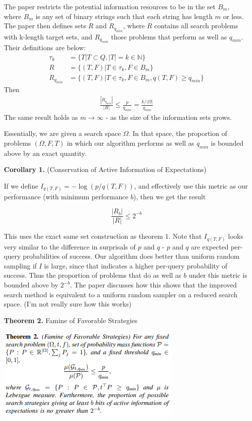 \documentclass[12pt]{article}
\begin{document}
The paper restricts the potential information resources to be in the set $B_m$, where $B_m$ is any set of binary strings such that each string has length $m$ or less. The paper then defines sets $R$ and $R_{q_{min}}$, where $R$ contains all search problems with k-length target sets, and $R_{q_{min}}$ those problems that perform as well as $q_{min}$. Their definitions are below: 
\begin{align*}
    \tau_k &= \{T | T \subset Q, |T| = k \in \mathds{N}\} \\ 
    R &= \{(T,F) | T \in \tau_k, F \in B_m\} \\
    R_{q_{min}} &= \{(T,F) | T \in \tau_k, F \in B_m, q(T,F) \geq q_{min}\}
\end{align*}
Then 
\begin{align*}
    \frac{|R_{q_{min}}|}{|R|} \leq \frac{p}{q_{min}} = \frac{k / |\Omega|}{q_{min}}
\end{align*}
The same result holds as $m \to \infty$ - as the size of the information sets grows.

Essentially, we are given a search space $\Omega$. In that space, the proportion of problems $(\Omega, F, T)$ in which our algorithm performs as well as $q_{min}$ is bounded above by an exact quantity. 

\bigskip 

\textbf{Corollary 1.} (Conservation of Active Information of Expectations)

If we define $I_{q(T,F)} = - \log(p/q(T,F))$, and effectively use this metric as our performance (with minimum performance $b$), then we get the result 

\[\frac{|R_b|}{|R|} \leq 2^{-b}\]

This uses the exact same set construction as theorem 1. Note that $I_{q(T,F)}$ looks very similar to the difference in surprisals of $p$ and $q$ - $p$ and $q$ are expected per-query probabilities of success. Our algorithm does better than uniform random sampling if $I$ is large, since that indicates a higher per-query probability of success. Thus the proportion of problems that do as well as $b$ under this metric is bounded above by $2^{-b}$. The paper discusses how this shows that the improved search method is equivalent to a uniform random sampler on a reduced search space. (I'm not really sure how this works) 

\bigskip

\textbf{Theorem 2.} Famine of Favorable Strategies
\begin{center}
    \includegraphics{FamineForte/FamineStrategy.PNG}
\end{center}
\end{document}
